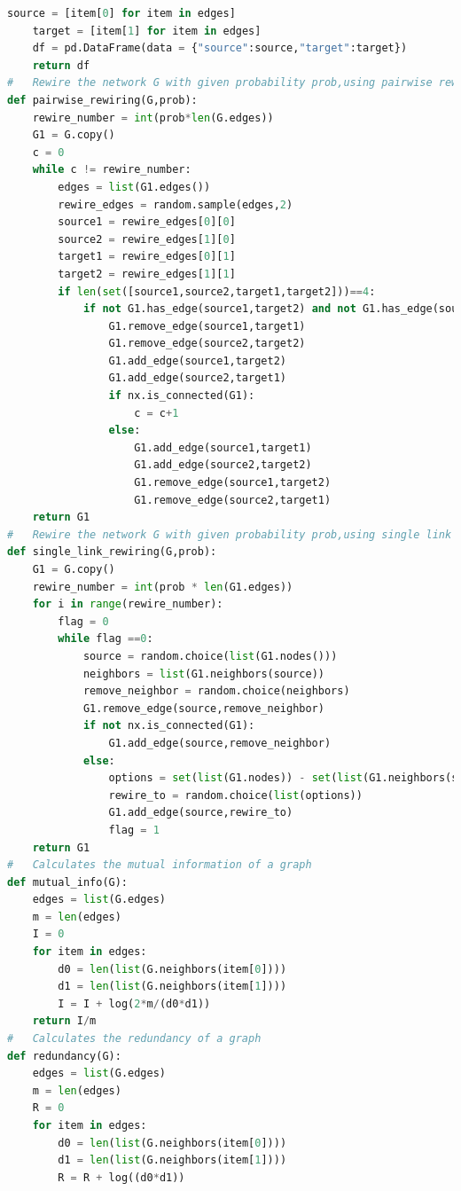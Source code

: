 \documentclass[12pt]{article}
\begin{document}
\begin{lstlisting}[language=Python,breaklines=true]
    source = [item[0] for item in edges]
    target = [item[1] for item in edges]
    df = pd.DataFrame(data = {"source":source,"target":target})
    return df
#   Rewire the network G with given probability prob,using pairwise rewiring
def pairwise_rewiring(G,prob):
    rewire_number = int(prob*len(G.edges))
    G1 = G.copy()
    c = 0 
    while c != rewire_number:
        edges = list(G1.edges())
        rewire_edges = random.sample(edges,2)
        source1 = rewire_edges[0][0]
        source2 = rewire_edges[1][0]
        target1 = rewire_edges[0][1]
        target2 = rewire_edges[1][1]
        if len(set([source1,source2,target1,target2]))==4:
            if not G1.has_edge(source1,target2) and not G1.has_edge(source2,target1):
                G1.remove_edge(source1,target1)
                G1.remove_edge(source2,target2)
                G1.add_edge(source1,target2)
                G1.add_edge(source2,target1)
                if nx.is_connected(G1):
                    c = c+1
                else:
                    G1.add_edge(source1,target1)
                    G1.add_edge(source2,target2)
                    G1.remove_edge(source1,target2)
                    G1.remove_edge(source2,target1)
    return G1
#   Rewire the network G with given probability prob,using single link rewiring
def single_link_rewiring(G,prob):
    G1 = G.copy()
    rewire_number = int(prob * len(G1.edges))
    for i in range(rewire_number):
        flag = 0
        while flag ==0:
            source = random.choice(list(G1.nodes()))
            neighbors = list(G1.neighbors(source))
            remove_neighbor = random.choice(neighbors)
            G1.remove_edge(source,remove_neighbor)
            if not nx.is_connected(G1):
                G1.add_edge(source,remove_neighbor)
            else:
                options = set(list(G1.nodes)) - set(list(G1.neighbors(source)))-set([source,remove_neighbor])
                rewire_to = random.choice(list(options))
                G1.add_edge(source,rewire_to)
                flag = 1
    return G1
#   Calculates the mutual information of a graph
def mutual_info(G):
    edges = list(G.edges)
    m = len(edges)
    I = 0
    for item in edges:
        d0 = len(list(G.neighbors(item[0])))
        d1 = len(list(G.neighbors(item[1]))) 
        I = I + log(2*m/(d0*d1))
    return I/m
#   Calculates the redundancy of a graph
def redundancy(G):
    edges = list(G.edges)
    m = len(edges)
    R = 0
    for item in edges:
        d0 = len(list(G.neighbors(item[0])))
        d1 = len(list(G.neighbors(item[1]))) 
        R = R + log((d0*d1))

\end{lstlisting}
\end{document}
